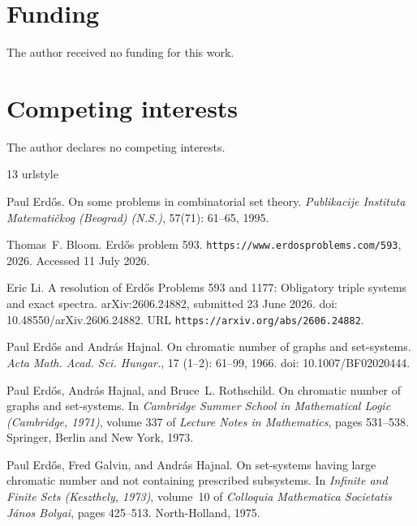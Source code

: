 \documentclass[a4paper,11pt,reqno]{amsart}
\theoremstyle{plain}
\theoremstyle{definition}
\theoremstyle{remark}
\begin{document}
\section*{Funding}
The author received no funding for this work.

\section*{Competing interests}
The author declares no competing interests.

\begin{thebibliography}{13}
\providecommand{\natexlab}[1]{#1}
\providecommand{\url}[1]{\texttt{#1}}
\expandafter\ifx\csname urlstyle\endcsname\relax
  \providecommand{\doi}[1]{doi: #1}\else
  \providecommand{\doi}{doi: \begingroup \urlstyle{rm}\Url}\fi

Paul Erd{\H{o}}s.
\newblock On some problems in combinatorial set theory.
\newblock \emph{Publikacije Instituta Matemati\v{c}kog (Beograd) (N.S.)},
  57(71): 61--65, 1995.

Thomas~F. Bloom.
\newblock Erd{\H{o}}s problem 593.
\newblock \url{https://www.erdosproblems.com/593}, 2026.
\newblock Accessed 11 July 2026.

Eric Li.
\newblock A resolution of {Erd{\H{o}}s Problems 593 and 1177}: Obligatory
  triple systems and exact spectra.
\newblock arXiv:2606.24882, submitted 23 June 2026.
\newblock \doi{10.48550/arXiv.2606.24882}.
\newblock URL \url{https://arxiv.org/abs/2606.24882}.

Paul Erd{\H{o}}s and Andr{\'a}s Hajnal.
\newblock On chromatic number of graphs and set-systems.
\newblock \emph{Acta Math. Acad. Sci. Hungar.}, 17
  (1--2): 61--99, 1966.
\newblock \doi{10.1007/BF02020444}.

Paul Erd{\H{o}}s, Andr{\'a}s Hajnal, and Bruce~L. Rothschild.
\newblock On chromatic number of graphs and set-systems.
\newblock In \emph{Cambridge Summer School in Mathematical Logic (Cambridge,
  1971)}, volume 337 of \emph{Lecture Notes in Mathematics}, pages 531--538.
  Springer, Berlin and New York, 1973.

Paul Erd{\H{o}}s, Fred Galvin, and Andr{\'a}s Hajnal.
\newblock On set-systems having large chromatic number and not containing
  prescribed subsystems.
\newblock In \emph{Infinite and Finite Sets (Keszthely, 1973)}, volume~10 of
  \emph{Colloquia Mathematica Societatis J{\'a}nos Bolyai}, pages 425--513.
  North-Holland, 1975.


\end{thebibliography}
\end{document}
